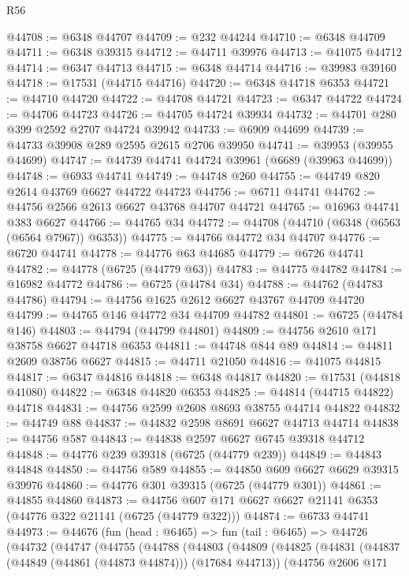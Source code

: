 \begin{lexlean}{R56}
\begin{coremodule}
@44708 := @6348 @44707
@44709 := @232 @44244
@44710 := @6348 @44709
@44711 := @6348 @39315
@44712 := @44711 @39976
@44713 := @41075 @44712
@44714 := @6347 @44713
@44715 := @6348 @44714
@44716 := @39983 @39160
@44718 := @17531 (@44715 @44716)
@44720 := @6348 @44718 @6353
@44721 := @44710 @44720
@44722 := @44708 @44721
@44723 := @6347 @44722
@44724 := @44706 @44723
@44726 := @44705 @44724 @39934
@44732 := @44701 @280 @399 @2592 @2707 @44724 @39942
@44733 := @6909 @44699
@44739 := @44733 @39908 @289 @2595 @2615 @2706 @39950
@44741 := @39953 (@39955 @44699)
@44747 := @44739 @44741 @44724 @39961 (@6689 (@39963 @44699))
@44748 := @6933 @44741
@44749 := @44748 @260
@44755 := @44749 @820 @2614 @43769 @6627 @44722 @44723
@44756 := @6711 @44741
@44762 := @44756 @2566 @2613 @6627 @43768 @44707 @44721
@44765 := @16963 @44741 @383 @6627
@44766 := @44765 @34
@44772 := @44708 (@44710 (@6348 (@6563 (@6564 @7967)) @6353))
@44775 := @44766 @44772 @34 @44707
@44776 := @6720 @44741
@44778 := @44776 @63 @44685
@44779 := @6726 @44741
@44782 := @44778 (@6725 (@44779 @63))
@44783 := @44775 @44782
@44784 := @16982 @44772
@44786 := @6725 (@44784 @34)
@44788 := @44762 (@44783 @44786)
@44794 := @44756 @1625 @2612 @6627 @43767 @44709 @44720
@44799 := @44765 @146 @44772 @34 @44709 @44782
@44801 := @6725 (@44784 @146)
@44803 := @44794 (@44799 @44801)
@44809 := @44756 @2610 @171 @38758 @6627 @44718 @6353
@44811 := @44748 @844 @89
@44814 := @44811 @2609 @38756 @6627
@44815 := @44711 @21050
@44816 := @41075 @44815
@44817 := @6347 @44816
@44818 := @6348 @44817
@44820 := @17531 (@44818 @41080)
@44822 := @6348 @44820 @6353
@44825 := @44814 (@44715 @44822) @44718
@44831 := @44756 @2599 @2608 @8693 @38755 @44714 @44822
@44832 := @44749 @88
@44837 := @44832 @2598 @8691 @6627 @44713 @44714
@44838 := @44756 @587
@44843 := @44838 @2597 @6627 @6745 @39318 @44712
@44848 := @44776 @239 @39318 (@6725 (@44779 @239))
@44849 := @44843 @44848
@44850 := @44756 @589
@44855 := @44850 @609 @6627 @6629 @39315 @39976
@44860 := @44776 @301 @39315 (@6725 (@44779 @301))
@44861 := @44855 @44860
@44873 := @44756 @607 @171 @6627 @6627 @21141 @6353 (@44776 @322 @21141 (@6725 (@44779 @322)))
@44874 := @6733 @44741
@44973 := @44676
    (fun (head : @6465) =>
    fun (tail : @6465) =>
    @44726
      (@44732
        (@44747
          (@44755
            (@44788
              (@44803
                (@44809
                  (@44825
                    (@44831
                      (@44837 (@44849 (@44861 (@44873 @44874))) (@17684 @44713))
                      (@44756
                        @2606
                        @171

\end{coremodule}
\end{lexlean}
